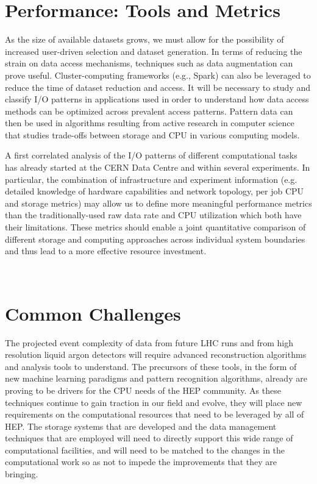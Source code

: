 \documentclass[12pt,a4paper]{article}
\begin{document}
\section{Performance: Tools and
Metrics}\label{performance-tools-and-metrics}

As the size of available datasets grows, we must allow for the
possibility of increased user-driven selection and dataset generation.
In terms of reducing the strain on data access mechanisms, techniques such as data
augmentation can prove useful. Cluster-computing frameworks (e.g.,
Spark) can also be leveraged to reduce the time of dataset reduction and
access. It will be necessary to study and classify I/O patterns in
applications used in order to understand how data access methods can be
optimized across prevalent access patterns. Pattern data can then be
used in algorithms resulting from active research in computer science
that studies trade-offs between storage and CPU in various computing models.

A first correlated analysis of the I/O patterns of different
computational tasks has already started at the CERN Data Centre and
within several experiments. In particular, the combination of
infrastructure and experiment information (e.g. detailed knowledge of
hardware capabilities and network topology, per job CPU and storage
metrics) may allow us to define more meaningful performance metrics than
the traditionally-used raw data rate and CPU utilization which both have
their limitations. These metrics should enable a joint quantitative
comparison of different storage and computing approaches across
individual system boundaries and thus lead to a more effective resource
investment.

~

\section{Common Challenges}\label{common-challenges}

The projected event complexity of data from future LHC runs and from
high resolution liquid argon detectors will require advanced
reconstruction algorithms and analysis tools to understand. The
precursors of these tools, in the form of new machine learning paradigms
and pattern recognition algorithms, already are proving to be drivers
for the CPU needs of the HEP community. As these techniques continue to
gain traction in our field and evolve, they will place new requirements on the computational
resources that need to be leveraged by all of HEP. The storage systems
that are developed and the data management techniques that are employed
will need to directly support this wide range of computational
facilities, and will need to be matched to the changes in the
computational work so as not to impede the improvements that they are
bringing.
\end{document}
